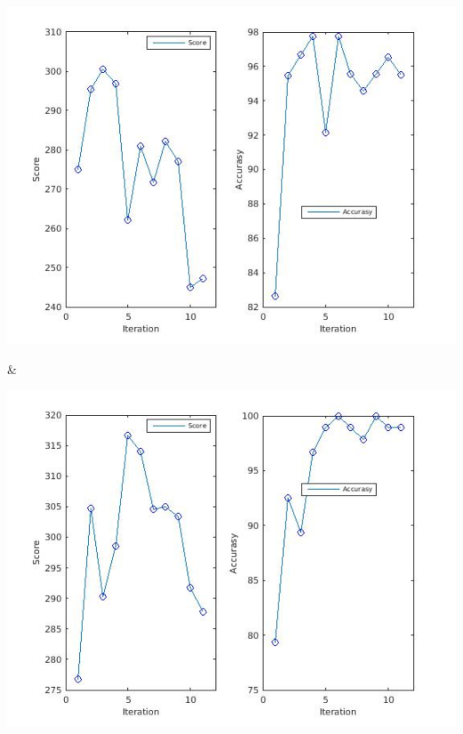 \documentclass[
	fontsize=12pt,
	paper=a4,
	twoside=false,
	numbers=noenddot,
	plainheadsepline,
	toc=listof,
	toc=bibliography
]{scrartcl}
\begin{document}
\begin{table}
\begin{tabular}
		\hline

		\rule{0pt}{5cm}
    	\parbox[b]{1em}{
			\includegraphics[scale = 0.28]{fig/method2/test2/accuracy_LL.jpg}} &
		\parbox[b]{1em}{
			\includegraphics[scale = 0.28]{test2/accuracy_LL.jpg}}  \\
		\hline	


\end{tabular}
\end{table}
\end{document}
